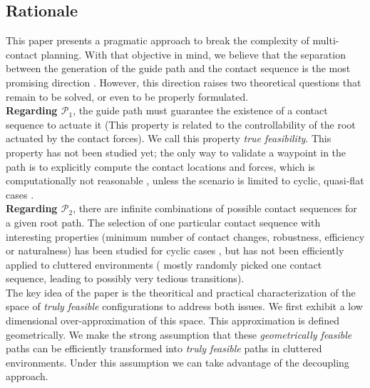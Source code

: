 \subsection{Rationale}
This paper presents a pragmatic approach to break the complexity of multi-contact planning. With that objective in mind,
we believe that the separation between the generation of the guide path and the contact sequence is the most promising direction \citep{DBLP:conf/iser/EscandeKMG08}.
However, this direction raises two theoretical questions that remain to be solved, or even to be properly formulated. \\

\noindent \textbf{Regarding $\mathcal{P}_1$}, the guide path must guarantee the existence of a contact sequence to actuate it (This property is related to the controllability of the root actuated by the contact forces). We call this property \textit{true feasibility}. This property has not been studied yet; the only way to validate a waypoint in the path is to explicitly compute the contact locations and forces, which is computationally not reasonable \citep{Bouyarmane2009}, unless the scenario is limited to cyclic, quasi-flat cases \citep{zucker2010optimization}. \\

\noindent \textbf{Regarding $\mathcal{P}_2$}, there are infinite combinations of possible contact sequences for a given root path. The selection of one particular contact sequence with interesting properties (minimum number of contact changes, robustness, efficiency or naturalness) has been studied for cyclic cases \citep{Hauser06usingmotion}, but has not been efficiently applied to cluttered environments (\citeauthor{bouyarmane:lirmm-00777727, DBLP:conf/iser/EscandeKMG08} mostly randomly picked one contact sequence, leading to possibly very tedious transitions).  \\



The key idea of the paper is the theoritical and practical characterization of the space of \textit{truly feasible} configurations to address both issues.
We first exhibit a low dimensional over-approximation of this space. This approximation is defined geometrically. 
We make the strong assumption that these \textit{geometrically feasible} paths can be efficiently transformed into \textit{truly feasible} paths
in cluttered environments. 
Under this assumption we can take advantage of the decoupling approach.

